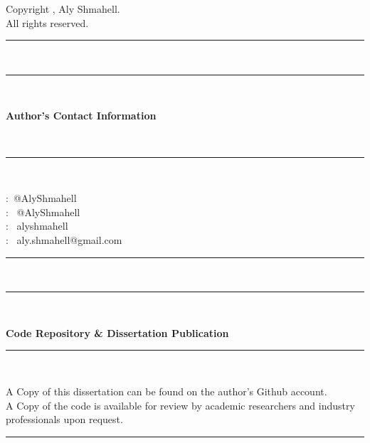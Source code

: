 \documentclass[a4paper, 12pt]{report}
\begin{document}
\begin{titlepage}
	\begin{tcbraster}[raster columns=2,raster rows=1,
		enhanced,size=small,fit algorithm=hybrid* ]
		\begin{center}
			\begin{tcolorbox}[colback=white]
				\begin{center}
					Copyright \textcopyright {}, Aly Shmahell.\\
					All rights reserved.
				\end{center}
		\end{tcolorbox}
		\end{center}
	\end{tcbraster}
	\rule{\linewidth}{0.5mm} \\[1.5cm]
	\noindent
	\rule{\linewidth}{0.5mm} \\[0.4cm]
	\begin{minipage}{0.5\textwidth}
		\Large{\textbf{Author's Contact Information}}
	\end{minipage}
	\\[0.1cm]
	\rule{\linewidth}{0.5mm} \\[0.1cm]
	\noindent
	\begin{center}
		\begin{minipage}{0.5\textwidth}
			\faGithub \space:~@AlyShmahell \\
			\faTwitter \space:~ @AlyShmahell \\
			\faLinkedinSquare \space:~ alyshmahell \\
			\faEnvelope \space:~ aly.shmahell@gmail.com
		\end{minipage}
	\end{center}
	\rule{\linewidth}{0.5mm} \\[1.5cm]
	\noindent
	\rule{\linewidth}{0.5mm} \\[0.2cm]
	\begin{minipage}{\textwidth}
		\Large{\textbf{Code Repository \& Dissertation Publication}}
	\end{minipage}
	\rule{\linewidth}{0.5mm} \\[0.1cm]
	\noindent
		\begin{flushleft}
		A Copy of this dissertation can be found on the author's Github account.\\
		A Copy of the code is available for review by academic researchers and industry professionals upon request.
		\end{flushleft}	
	\rule{\linewidth}{0.5mm}
	\noindent
\end{titlepage}
\newpage
\end{document}
